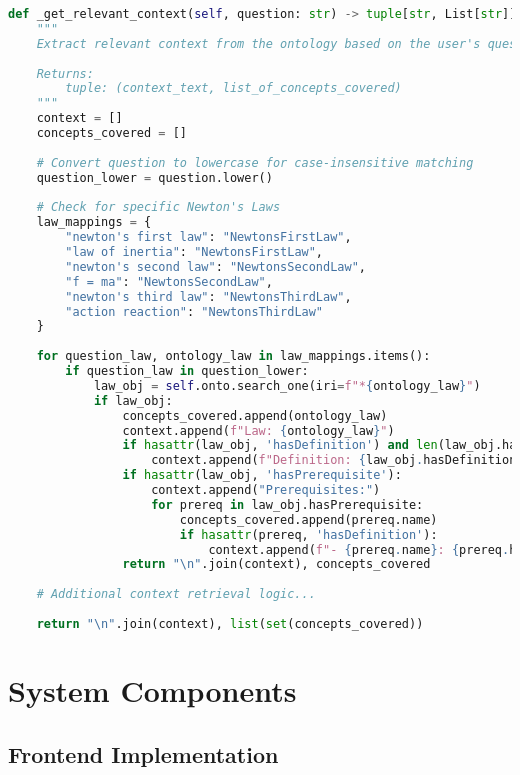 \begin{lstlisting}[language=Python, caption=Ontology Context Retrieval, label=lst:context-retrieval]
def _get_relevant_context(self, question: str) -> tuple[str, List[str]]:
    """
    Extract relevant context from the ontology based on the user's question.
    
    Returns:
        tuple: (context_text, list_of_concepts_covered)
    """
    context = []
    concepts_covered = []
    
    # Convert question to lowercase for case-insensitive matching
    question_lower = question.lower()
    
    # Check for specific Newton's Laws
    law_mappings = {
        "newton's first law": "NewtonsFirstLaw",
        "law of inertia": "NewtonsFirstLaw",
        "newton's second law": "NewtonsSecondLaw",
        "f = ma": "NewtonsSecondLaw",
        "newton's third law": "NewtonsThirdLaw",
        "action reaction": "NewtonsThirdLaw"
    }
    
    for question_law, ontology_law in law_mappings.items():
        if question_law in question_lower:
            law_obj = self.onto.search_one(iri=f"*{ontology_law}")
            if law_obj:
                concepts_covered.append(ontology_law)
                context.append(f"Law: {ontology_law}")
                if hasattr(law_obj, 'hasDefinition') and len(law_obj.hasDefinition) > 0:
                    context.append(f"Definition: {law_obj.hasDefinition[0]}")
                if hasattr(law_obj, 'hasPrerequisite'):
                    context.append("Prerequisites:")
                    for prereq in law_obj.hasPrerequisite:
                        concepts_covered.append(prereq.name)
                        if hasattr(prereq, 'hasDefinition'):
                            context.append(f"- {prereq.name}: {prereq.hasDefinition[0]}")
                return "\n".join(context), concepts_covered
                
    # Additional context retrieval logic...
    
    return "\n".join(context), list(set(concepts_covered))
\end{lstlisting}

\section{System Components}
\label{sec:system-components}

\subsection{Frontend Implementation}
\label{subsec:frontend}


